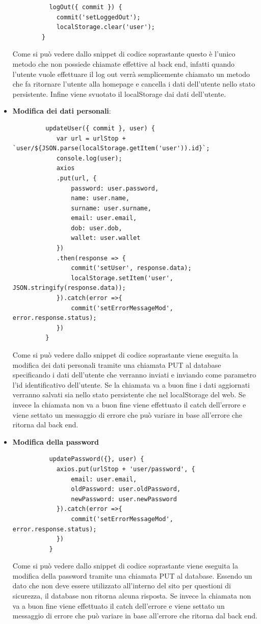\begin{itemize}
\begin{lstlisting}
		  logOut({ commit }) {
			commit('setLoggedOut');
			localStorage.clear('user');
		}
	\end{lstlisting}
	Come si può vedere dallo snippet di codice soprastante questo è l'unico metodo che non possiede chiamate effettive al back end, infatti quando l'utente vuole effettuare il log out verrà semplicemente chiamato un metodo che fa ritornare l'utente alla homepage e cancella i dati dell'utente nello stato persistente. Infine viene svuotato il localStorage dai dati dell'utente.
	\item \textbf{Modifica dei dati personali}:
	\begin{lstlisting}
		 updateUser({ commit }, user) {
		 	var url = urlStop + `user/${JSON.parse(localStorage.getItem('user')).id}`;
		 	console.log(user);
		 	axios
		 	.put(url, {
		 		password: user.password,
		 		name: user.name,
		 		surname: user.surname,
		 		email: user.email,
		 		dob: user.dob,
		 		wallet: user.wallet
		 	})
		 	.then(response => {
		 		commit('setUser', response.data);
		 		localStorage.setItem('user', JSON.stringify(response.data));
		 	}).catch(error =>{
		 		commit('setErrorMessageMod', error.response.status);
		 	})
		 }
	\end{lstlisting}
	Come si può vedere dallo snippet di codice soprastante viene eseguita la modifica dei dati personali tramite una chiamata PUT al database specificando i dati dell'utente che verranno inviati e inviando come parametro l'id identificativo dell'utente. Se la chiamata va a buon fine i dati aggiornati verranno salvati sia nello stato persistente che nel localStorage del web. Se invece  la chiamata non va a buon fine viene effettuato il catch dell'errore e viene settato un messaggio di errore che può variare in base all'errore che ritorna dal back end.
	\item \textbf{Modifica della password}
	\begin{lstlisting}
		  updatePassword({}, user) {
		  	axios.put(urlStop + 'user/password', {
		  		email: user.email,
		  		oldPassword: user.oldPassword,
		  		newPassword: user.newPassword
		  	}).catch(error =>{
		  		commit('setErrorMessageMod', error.response.status);
		  	})
		  }
	\end{lstlisting}
	Come si può vedere dallo snippet di codice soprastante viene eseguita la modifica della password tramite una chiamata PUT al database. Essendo un dato che non deve essere utilizzato all'interno del sito per questioni di sicurezza, il database non ritorna alcuna risposta. Se invece  la chiamata non va a buon fine viene effettuato il catch dell'errore e viene settato un messaggio di errore che può variare in base all'errore che ritorna dal back end.
\end{itemize}

